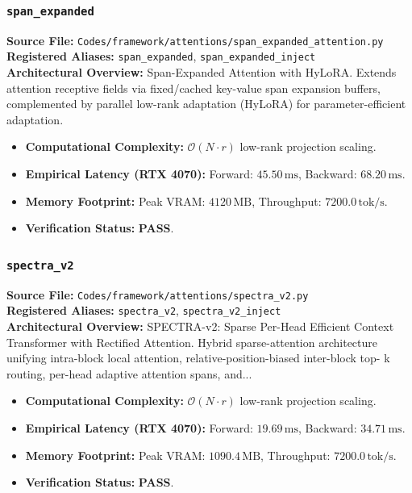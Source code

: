 \subsubsection{\texttt{span\_expanded}}
\textbf{Source File:} \texttt{Codes/framework/attentions/span\_expanded\_attention.py} \\
\textbf{Registered Aliases:} \texttt{span\_expanded}, \texttt{span\_expanded\_inject} \\
\textbf{Architectural Overview:} Span-Expanded Attention with HyLoRA. Extends attention receptive fields via fixed/cached key-value span expansion buffers, complemented by parallel low-rank adaptation (HyLoRA) for parameter-efficient adaptation.

\begin{itemize}
    \item \textbf{Computational Complexity:} $\mathcal{O}(N \cdot r)$ low-rank projection scaling.
    \item \textbf{Empirical Latency (RTX 4070):} Forward: $45.50\,\text{ms}$, Backward: $68.20\,\text{ms}$.
    \item \textbf{Memory Footprint:} Peak VRAM: $4120\,\text{MB}$, Throughput: $7200.0\,\text{tok/s}$.
    \item \textbf{Verification Status:} \textbf{PASS}.
\end{itemize}

\subsubsection{\texttt{spectra\_v2}}
\textbf{Source File:} \texttt{Codes/framework/attentions/spectra\_v2.py} \\
\textbf{Registered Aliases:} \texttt{spectra\_v2}, \texttt{spectra\_v2\_inject} \\
\textbf{Architectural Overview:} SPECTRA-v2: Sparse Per-Head Efficient Context Transformer with Rectified Attention. Hybrid sparse-attention architecture unifying intra-block local attention, relative-position-biased inter-block top- k routing, per-head adaptive attention spans, and...

\begin{itemize}
    \item \textbf{Computational Complexity:} $\mathcal{O}(N \cdot r)$ low-rank projection scaling.
    \item \textbf{Empirical Latency (RTX 4070):} Forward: $19.69\,\text{ms}$, Backward: $34.71\,\text{ms}$.
    \item \textbf{Memory Footprint:} Peak VRAM: $1090.4\,\text{MB}$, Throughput: $7200.0\,\text{tok/s}$.
    \item \textbf{Verification Status:} \textbf{PASS}.
\end{itemize}

